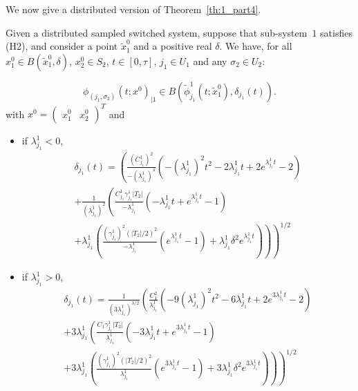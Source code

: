 We now give a distributed version of Theorem~\ref{th:1_part4}.
\begin{theorem}\label{th:1_part4bis}
  Given a distributed sampled switched system, suppose that
  sub-system~$1$ satisfies (H2), and consider a point $\tilde{x}_1^0$
  and a positive real $\delta$.
  We have, for all $x_1^0\in B(\tilde{x}_1^0,\delta)$, $x_2^0 \in
  S_2$, $t\in [0,\tau]$, $j_1\in U_1$ and any $\sigma_2 \in U_2$:

  $$\phi_{(j_1,\sigma_2)}(t;x^0)_{|1}\in B(\tilde{\phi}_{j_ 1}^1(t;\tilde{x}_1^0),\delta_{j_1}(t)).$$
  with $x^0 = \begin{pmatrix}x_1^0 & x_2^0\end{pmatrix}^T$ and
  \begin{itemize}
  \item if $\lambda^1_{j_1} <0$,
    \begin{multline}
      \delta_{j_1} (t) =
      \left( \frac{(C_{j_1}^1)^2}{-(\lambda^1_{j_1})^4} \left( - (\lambda^1_{j_1})^2 t^2 - 2 \lambda^1_{j_1} t + 2 e^{\lambda^1_{j_1} t} - 2 \right) \right.   \\
      + \left. \frac{1}{(\lambda^1_{j_1})^2} \left( \frac{C_{j_1}^1 \gamma^1_{j_1} |T_2|}{-\lambda^1_{j_1}} \left( - \lambda^1_{j_1} t + e^{\lambda^1_{j_1} t} -1 \right) \right. \right.  \\ + \left. \left. \lambda^1_{j_1} \left( \frac{(\gamma^1_{j_1} )^2 (|T_2 |/2)^2}{-\lambda^1_{j_1}} ( e^{\lambda^1_{j_1} t } - 1) + \lambda^1_{j_1} \delta^2 e^{\lambda^1_{j_1} t}  \right) \right)  \right)^{1/2}
    \end{multline}
\item if $\lambda^1_{j_1} >0$,
  \begin{multline}
    \delta_{j_1} (t) = \frac{1}{(3\lambda^1_{j_1})^{3/2}} \left( \frac{C_1^2}{\lambda^1_{j_1}} \left( - 9(\lambda^1_{j_1})^2 t^2 - 6\lambda^1_{j_1} t + 2 e^{3\lambda^1_{j_1} t} - 2 \right) \right.   \\
    + \left. 3\lambda^1_{j_1} \left( \frac{C_1 \gamma^1_{j_1} |T_2|}{\lambda^1_{j_1}} \left( - 3\lambda^1_{j_1} t + e^{3\lambda^1_{j_1} t} -1 \right) \right. \right.  \\
    + \left. \left. 3\lambda^1_{j_1} \left( \frac{(\gamma^1_{j_1}) ^2 (|T_2 |/2)^2}{\lambda^1_{j_1}} ( e^{3\lambda^1_{j_1} t } - 1) + 3\lambda^1_{j_1} \delta^2 e^{3\lambda^1_{j_1} t}  \right) \right)  \right)^{1/2}

\end{multline}
\end{itemize}
\end{theorem}
